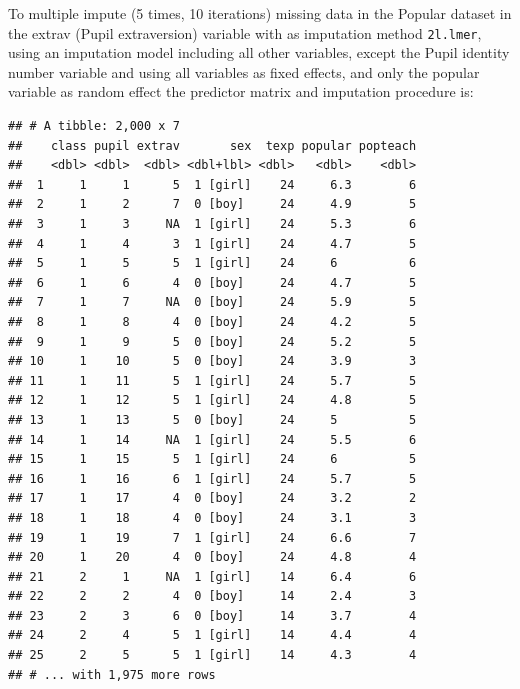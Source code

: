 \documentclass[
]{book}
\newenvironment{Shaded}{\begin{snugshade}}{\end{snugshade}}
\newcommand{\DataTypeTok}[1]{\textcolor[rgb]{0.13,0.29,0.53}{#1}}
\newcommand{\DecValTok}[1]{\textcolor[rgb]{0.00,0.00,0.81}{#1}}
\newcommand{\KeywordTok}[1]{\textcolor[rgb]{0.13,0.29,0.53}{\textbf{#1}}}
\newcommand{\NormalTok}[1]{#1}
\newcommand{\OperatorTok}[1]{\textcolor[rgb]{0.81,0.36,0.00}{\textbf{#1}}}
\newcommand{\StringTok}[1]{\textcolor[rgb]{0.31,0.60,0.02}{#1}}
\begin{document}
To multiple impute (5 times, 10 iterations) missing data in the Popular dataset in the extrav (Pupil extraversion) variable with as imputation method \texttt{2l.lmer}, using an imputation model including all other variables, except the Pupil identity number variable and using all variables as fixed effects, and only the popular variable as random effect the predictor matrix and imputation procedure is:

\begin{Shaded}
\end{Shaded}

\begin{verbatim}
## # A tibble: 2,000 x 7
##    class pupil extrav       sex  texp popular popteach
##    <dbl> <dbl>  <dbl> <dbl+lbl> <dbl>   <dbl>    <dbl>
##  1     1     1      5  1 [girl]    24     6.3        6
##  2     1     2      7  0 [boy]     24     4.9        5
##  3     1     3     NA  1 [girl]    24     5.3        6
##  4     1     4      3  1 [girl]    24     4.7        5
##  5     1     5      5  1 [girl]    24     6          6
##  6     1     6      4  0 [boy]     24     4.7        5
##  7     1     7     NA  0 [boy]     24     5.9        5
##  8     1     8      4  0 [boy]     24     4.2        5
##  9     1     9      5  0 [boy]     24     5.2        5
## 10     1    10      5  0 [boy]     24     3.9        3
## 11     1    11      5  1 [girl]    24     5.7        5
## 12     1    12      5  1 [girl]    24     4.8        5
## 13     1    13      5  0 [boy]     24     5          5
## 14     1    14     NA  1 [girl]    24     5.5        6
## 15     1    15      5  1 [girl]    24     6          5
## 16     1    16      6  1 [girl]    24     5.7        5
## 17     1    17      4  0 [boy]     24     3.2        2
## 18     1    18      4  0 [boy]     24     3.1        3
## 19     1    19      7  1 [girl]    24     6.6        7
## 20     1    20      4  0 [boy]     24     4.8        4
## 21     2     1     NA  1 [girl]    14     6.4        6
## 22     2     2      4  0 [boy]     14     2.4        3
## 23     2     3      6  0 [boy]     14     3.7        4
## 24     2     4      5  1 [girl]    14     4.4        4
## 25     2     5      5  1 [girl]    14     4.3        4
## # ... with 1,975 more rows
\end{verbatim}
\end{document}
